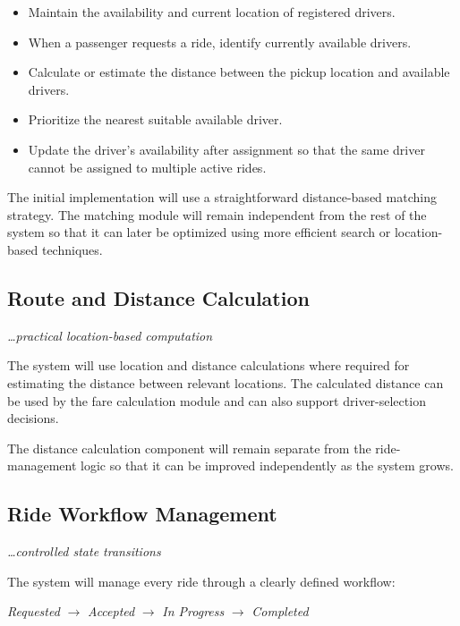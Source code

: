 \documentclass[11pt,a4paper]{article}
\newcommand{\BvrHint}[1]{%
  {\normalfont\normalsize\itshape\hfill #1}}
\begin{document}
\begin{itemize}

    \item Maintain the availability and current location of
    registered drivers.

    \item When a passenger requests a ride, identify currently
    available drivers.

    \item Calculate or estimate the distance between the pickup
    location and available drivers.

    \item Prioritize the nearest suitable available driver.

    \item Update the driver's availability after assignment so that
    the same driver cannot be assigned to multiple active rides.

\end{itemize}

The initial implementation will use a straightforward distance-based
matching strategy. The matching module will remain independent from
the rest of the system so that it can later be optimized using more
efficient search or location-based techniques.


\subsection{Route and Distance Calculation}
\BvrHint{\ldots practical location-based computation}

The system will use location and distance calculations where
required for estimating the distance between relevant locations.
The calculated distance can be used by the fare calculation module
and can also support driver-selection decisions.

The distance calculation component will remain separate from the
ride-management logic so that it can be improved independently as
the system grows.


\subsection{Ride Workflow Management}
\BvrHint{\ldots controlled state transitions}

The system will manage every ride through a clearly defined workflow:

\begin{center}
\textit{Requested} $\rightarrow$
\textit{Accepted} $\rightarrow$
\textit{In Progress} $\rightarrow$
\textit{Completed}
\end{center}
\end{document}
